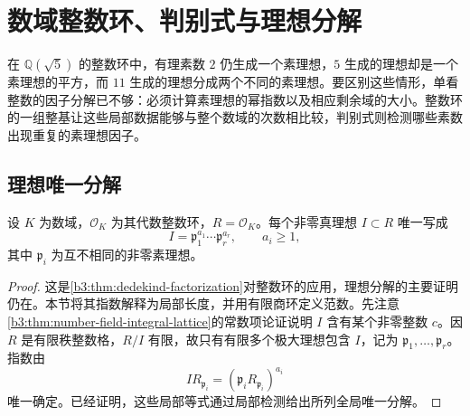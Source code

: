 
\section{数域整数环、判别式与理想分解}
\label{b3:sec:A02}

%
%
%

在 \(\mathbb Q(\sqrt5)\) 的整数环中，有理素数 \(2\) 仍生成一个素理想，\(5\) 生成的理想却是一个素理想的平方，而 \(11\) 生成的理想分成两个不同的素理想。要区别这些情形，单看整数的因子分解已不够：必须计算素理想的幂指数以及相应剩余域的大小。整数环的一组整基让这些局部数据能够与整个数域的次数相比较，判别式则检测哪些素数出现重复的素理想因子。

\subsection{理想唯一分解}
\label{b3:subsec:A02:01}

\begin{theorem}\label{b3:thm:integer-ideal-factorization}
	设 \(K\) 为数域，\(\mathcal O_K\) 为其代数整数环，\(R=\mathcal O_K\)。每个非零真理想 \(I\subset R\) 唯一写成
	\[
		I=\mathfrak p_1^{a_1}\cdots\mathfrak p_r^{a_r}, \qquad a_i\ge1,
	\]
	其中 \(\mathfrak p_i\) 为互不相同的非零素理想。
\end{theorem}
\begin{proof}
	这是\cref{b3:thm:dedekind-factorization}对整数环的应用，理想分解的主要证明仍在。本节将其指数解释为局部长度，并用有限商环定义范数。先注意\cref{b3:thm:number-field-integral-lattice}的常数项论证说明 \(I\) 含有某个非零整数 \(c\)。因 \(R\) 是有限秩整数格，\(R/I\) 有限，故只有有限多个极大理想包含 \(I\)，记为 \(\mathfrak p_1,\ldots,\mathfrak p_r\)。指数由
	\[
		IR_{\mathfrak p_i}=(\mathfrak p_iR_{\mathfrak p_i})^{a_i}
	\]
	唯一确定。已经证明，这些局部等式通过局部检测给出所列全局唯一分解。
\end{proof}

